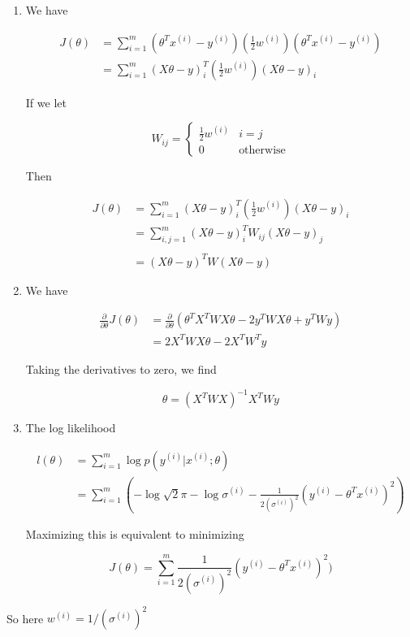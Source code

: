 \begin{answer}
    \begin{enumerate}
    \item
    We have

    $$
    \begin{aligned}
J(\theta) &= \sum_{i=1}^m (\theta^Tx^{(i)} - y^{(i)})(\frac{1}{2}w^{(i)}) (\theta^Tx^{(i)} - y^{(i)})\\
&= \sum_{i=1}^m (X\theta -y)^T_i (\frac{1}{2}w^{(i)}) (X\theta- y)_i
\end{aligned}
$$

If we let 

$$
W_{ij} = \begin{cases}
\frac{1}{2}w^{(i)} &i=j\\
0&\text{otherwise}
\end{cases}
$$

Then 

$$
\begin{aligned}
J(\theta)
&= \sum_{i=1}^m (X\theta -y)^T_i (\frac{1}{2}w^{(i)}) (X\theta- y)_i\\
&= \sum_{i, j=1}^m (X\theta -y)^T_i W_{ij} (X\theta- y)_j\\\\
&= (X\theta - y)^T W(X\theta - y)
\end{aligned}
$$
\item
    We have

    $$
    \begin{aligned}
\frac{\partial}{\partial \theta}J(\theta) &= \frac{\partial}{\partial \theta} (\theta^TX^TWX\theta - 2y^TW X\theta + y^TWy)\\
&=  2X^TWX\theta - 2 X^TW^Ty
\end{aligned}
$$

Taking the derivatives to zero, we find

$$
\theta = (X^TWX)^{-1}X^TW y
$$

\item

The log likelihood

$$
\begin{aligned}
l(\theta) &= \sum_{i=1}^m \log p(y^{(i)}|x^{(i)};\theta)\\
&= \sum_{i=1}^m(-\log \sqrt2\pi - \log \sigma^{(i)} - \frac{1}{2(\sigma^{(i)})^2} (y^{(i)} - \theta^Tx^{(i)})^2)
\end{aligned}
$$

Maximizing this is equivalent to minimizing

$$
            J(\theta) = \sum_{i=1}^m\frac{1}{2(\sigma^{(i)})^2} (y^{(i)} - \theta^Tx^{(i)})^2)
            $$

    \end{enumerate}

So here $w^{(i)} = 1/ (\sigma^{(i)})^2$

\end{answer}
